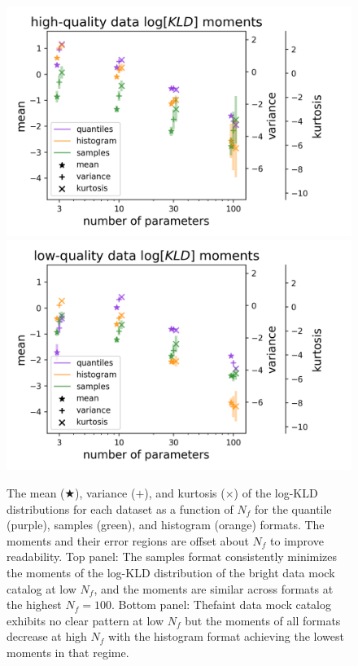 \documentclass[\docopts]{\docclass}
\newcommand{\mgdata}{bright\xspace}
\newcommand{\ssdata}{faint\xspace}
\begin{document}
\begin{figure}
  \includegraphics[width=0.9\columnwidth]{graham_moments.png}\\
  \includegraphics[width=0.9\columnwidth]{schmidt_moments.png}
  \caption{The mean ($\bigstar$), variance ($+$), and kurtosis ($\times$) of 
the log-KLD distributions for each dataset as a function of $N_{f}$ for the 
quantile (purple), samples (green), and histogram (orange) formats.
  The moments and their error regions are offset about $N_{f}$ to improve 
readability.
  Top panel: The samples format consistently minimizes the moments of the 
log-KLD distribution of the \mgdata data mock catalog at low $N_{f}$, and the 
moments are similar across formats at the highest $N_{f}=100$.
  Bottom panel: The\ssdata data mock catalog exhibits no clear pattern at low 
$N_{f}$ but the moments of all formats decrease at high $N_{f}$ with the 
histogram format achieving the lowest moments in that regime.
  \label{fig:moments}}
\end{figure}
\end{document}
